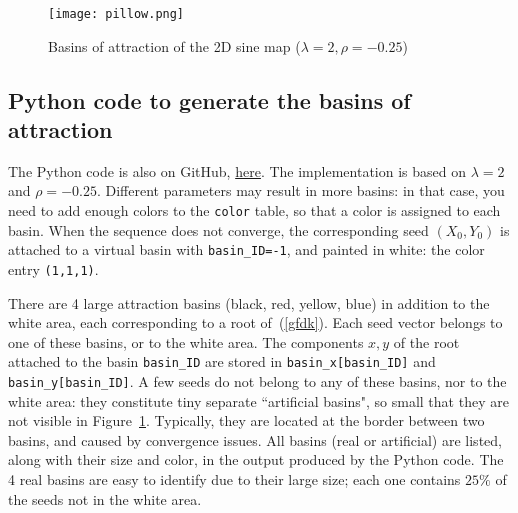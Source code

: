 \documentclass[oneside,10pt]{book}
\begin{document}
\begin{figure}%
\centering
\texttt{[image: pillow.png]}  %
\caption{Basins of attraction of the 2D sine map ($\lambda=2,\rho=-0.25$)}
\label{fig:rheypll}
\end{figure}

\subsection{Python code to generate the basins of attraction}\label{pytgr}

The Python code is also on GitHub, \href{https://github.com/VincentGranville/Stochastic-Processes/blob/master/basin.py}{here}.
The implementation is based on $\lambda=2$ and $\rho=-0.25$. Different parameters may result in more basins: in that case, you need to
add enough colors to the \texttt{color} table, so that a color is assigned to each basin. When the sequence does not converge,
 the corresponding seed $(X_0,Y_0)$ is attached to a virtual basin with \texttt{basin\_ID=-1}, and
 painted in white: the color entry \texttt{(1,1,1)}. 

There are 4 large attraction basins (black, red, yellow, blue) in addition to the white area, each corresponding to a root of~(\ref{gfdk}).
 Each seed vector belongs to one of these basins, or to the white area.
 The components $x,y$ of the root attached to the basin \texttt{basin\_ID} 
are stored in \texttt{basin\_x[basin\_ID]} and \texttt{basin\_y[basin\_ID]}. 
A few seeds do not belong to any of these basins, nor to
 the white area: they constitute tiny separate ``artificial basins", so small that they are not visible in Figure~\ref{fig:rheypll}. Typically,
 they are located at the border between two basins, and caused by convergence issues. All basins (real or artificial) are listed, along with their size and color,  in the output produced
 by the Python code. The 4 real basins are easy to identify due to their large size; each one contains $25\%$ of the seeds not in the white area.
\vspace{1ex}
\end{document}
